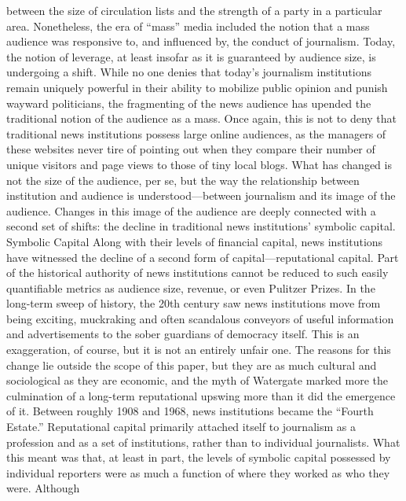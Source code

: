 between the size of circulation lists and the strength of a party in a particular area.
Nonetheless, the era of ``mass'' media included the notion that a mass audience
was responsive to, and influenced by, the conduct of journalism.
Today, the notion of leverage, at least insofar as it is guaranteed by audience size,
is undergoing a shift. While no one denies that today’s journalism institutions
remain uniquely powerful in their ability to mobilize public opinion and punish
wayward politicians, the fragmenting of the news audience has upended the
traditional notion of the audience as a mass. Once again, this is not to deny that
traditional news institutions possess large online audiences, as the managers of
these websites never tire of pointing out when they compare their number of
unique visitors and page views to those of tiny local blogs. What has changed is
not the size of the audience, per se, but the way the relationship between institution
and audience is understood—between journalism and its image of the audience.
Changes in this image of the audience are deeply connected with a second
set of shifts: the decline in traditional news institutions’ symbolic capital.
Symbolic Capital
Along with their levels of financial capital, news institutions have witnessed the
decline of a second form of capital—reputational capital. Part of the historical
authority of news institutions cannot be reduced to such easily quantifiable metrics
as audience size, revenue, or even Pulitzer Prizes. In the long-term sweep of
history, the 20th century saw news institutions move from being exciting, muckraking
and often scandalous conveyors of useful information and advertisements
to the sober guardians of democracy itself. This is an exaggeration, of course, but
it is not an entirely unfair one. The reasons for this change lie outside the scope
of this paper, but they are as much cultural and sociological as they are economic,
and the myth of Watergate marked more the culmination of a long-term reputational
upswing more than it did the emergence of it. Between roughly 1908 and
1968, news institutions became the ``Fourth Estate.''
Reputational capital primarily attached itself to journalism as a profession and
as a set of institutions, rather than to individual journalists. What this meant was
that, at least in part, the levels of symbolic capital possessed by individual reporters
were as much a function of where they worked as who they were. Although

